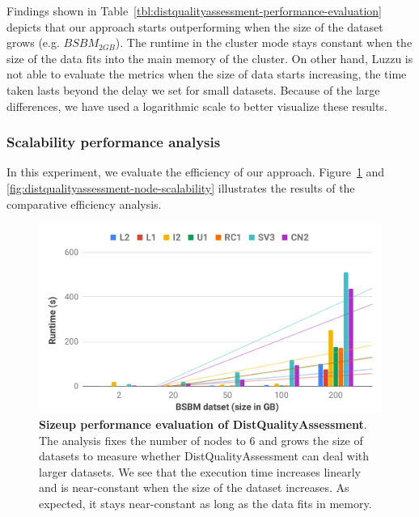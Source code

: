 Findings shown in Table~\ref{tbl:distqualityassessment-performance-evaluation} depicts that our approach starts outperforming when the size of the dataset grows (e.g. $BSBM_{2GB}$).
The runtime in the cluster mode stays constant when the size of the data fits into the main memory of the cluster.
On other hand, Luzzu is not able to evaluate the metrics when the size of data starts increasing, the time taken lasts beyond the delay we set for small datasets. 
Because of the large differences, we have used a logarithmic scale to better visualize these results.

\subsubsection{Scalability performance analysis}
\label{subsubsection:distqualityassessment-scalability_performance}
In this experiment, we evaluate the efficiency of our approach.
Figure~\ref{fig:distqualityassessment-sizeup-scalability} and \ref{fig:distqualityassessment-node-scalability} illustrates the results of the comparative efficiency analysis.

\begin{figure}
\centering
 \includegraphics[width=1.0\columnwidth]{images/5_distqualityassessment/distqualityassessment-sizeup-scalability.pdf}
    \caption{\textbf{Sizeup performance evaluation of DistQualityAssessment}.
    The analysis fixes the number of nodes to 6 and grows the size of datasets to measure whether DistQualityAssessment can deal with larger datasets.
    We see that the execution time increases linearly and is near-constant when the size of the dataset increases. 
    As expected, it stays near-constant as long as the data fits in memory.}
    \label{fig:distqualityassessment-sizeup-scalability}
\end{figure}

